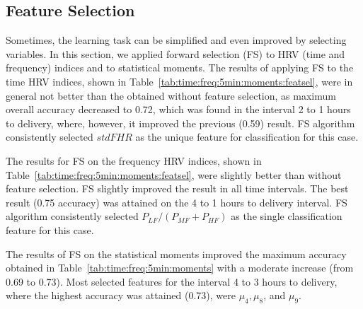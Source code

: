 

\subsection{Feature Selection}

Sometimes, the learning task can be simplified and even improved by selecting variables. In this section, we applied forward selection (FS) to  HRV (time and frequency) indices and to statistical moments.   The results of applying  FS to the time HRV indices, shown in Table~\ref{tab:time:freq:5min:moments:featsel}, were in general not better than the obtained without feature selection, as maximum overall accuracy decreased to 0.72, which was found in the interval 2 to 1 hours to delivery, where, however, it improved the previous (0.59) result. FS algorithm consistently selected $stdFHR$  as the unique feature for classification for this case.

The results for FS on the frequency HRV indices, shown in Table~\ref{tab:time:freq:5min:moments:featsel}, were slightly better than without feature selection. FS slightly improved the result in all time intervals. The best result (0.75 accuracy) was attained on the  4 to 1 hours to delivery interval. FS algorithm consistently selected $P_{LF}/(P_{MF}+P_{HF})$  as the single classification feature for this case. 

The results of FS on the statistical moments improved the maximum accuracy obtained in Table~\ref{tab:time:freq:5min:moments} with a moderate increase  (from 0.69 to 0.73). Most selected features for the interval 4 to 3 hours to delivery, where the highest accuracy was attained (0.73), were $\mu_4, \mu_8$, and $\mu_9$. 

